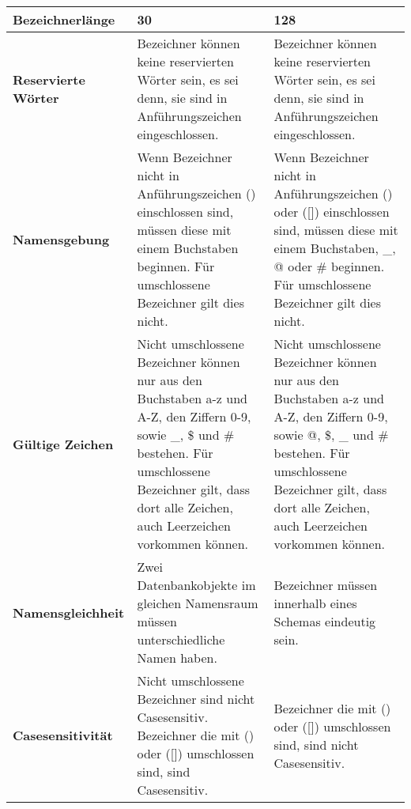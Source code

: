 \begin{center}
    \label{createtablerestrictions}
    \begin{small}
        \tabletail{
            \hline
        }
        \tablelasttail{
            \hline
        }
        \begin{supertabular}{|l|p{5.5cm}|p{5.7cm}|}
            \textbf{Bezeichnerlänge} & 30 & 128\\
            \hline
            \textbf{Reservierte Wörter} & Bezeichner können keine reservierten Wörter sein, es sei denn, sie sind in Anführungszeichen  eingeschlossen. & Bezeichner können keine reservierten Wörter sein, es sei denn, sie sind in Anführungszeichen  eingeschlossen. \\
            \hline
            \textbf{Namensgebung} & Wenn Bezeichner nicht in Anführungszeichen () einschlossen sind, müssen diese mit einem Buchstaben beginnen. Für umschlossene Bezeichner gilt dies nicht. & Wenn Bezeichner nicht in Anführungszeichen () oder ([]) einschlossen sind, müssen diese mit einem Buchstaben, \_, @ oder \# beginnen. Für umschlossene Bezeichner gilt dies nicht. \\
            \hline
            \textbf{Gültige Zeichen} & Nicht umschlossene Bezeichner können nur aus den Buchstaben a-z und A-Z, den Ziffern 0-9, sowie \_, \$ und \# bestehen. Für umschlossene Bezeichner gilt, dass dort alle Zeichen, auch Leerzeichen vorkommen können. & Nicht umschlossene Bezeichner können nur aus den Buchstaben a-z und A-Z, den Ziffern 0-9, sowie @, \$, \_ und \# bestehen. Für umschlossene Bezeichner gilt, dass dort alle Zeichen, auch Leerzeichen vorkommen können. \\
            \hline
            \textbf{Namensgleichheit} & Zwei Datenbankobjekte im gleichen Namensraum müssen unterschiedliche Namen haben.  & Bezeichner müssen innerhalb eines Schemas eindeutig sein.\\
            \hline
            \textbf{Casesensitivität} & Nicht umschlossene Bezeichner sind nicht Casesensitiv. Bezeichner die mit () oder ([]) umschlossen sind, sind Casesensitiv. & Bezeichner die mit () oder ([]) umschlossen sind, sind nicht Casesensitiv. \\
        \end{supertabular}
    \end{small}
\end{center}
